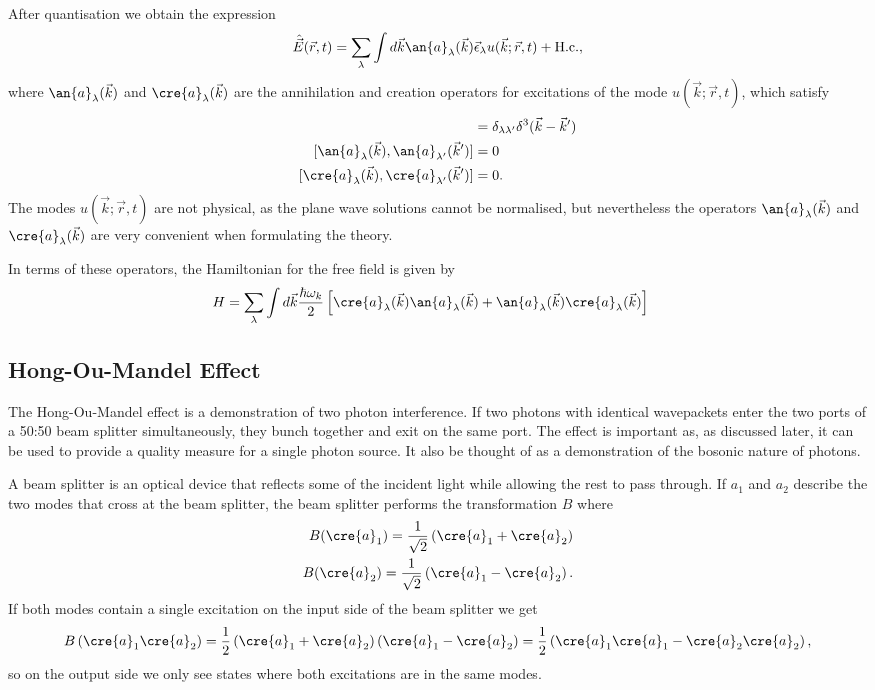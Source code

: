 After quantisation we obtain the expression
\begin{align}
  \hat{\vec{E}}(\vec{r}, t) = \sum_\lambda \int d\vec{k} \an{a}_\lambda(\vec{k})\vec{\epsilon}_\lambda u(\vec{k}; \vec{r}, t) + \text{H.c.},
\end{align}
where $\an{a}_\lambda(\vec{k})$ and $\cre{a}_\lambda(\vec{k})$ are the annihilation and creation operators for excitations of the mode $u(\vec{k}; \vec{r},t)$, which satisfy
\begin{align}
  [\an{a}_\lambda(\vec{k}), \cre{a}_{\lambda '}(\vec{k}')]  &= \delta_{\lambda\lambda '}\delta^3(\vec{k} - \vec{k}') \\
  [\an{a}_\lambda(\vec{k}), \an{a}_{\lambda '}(\vec{k}')]  &= 0 \\
  [\cre{a}_\lambda(\vec{k}), \cre{a}_{\lambda '}(\vec{k}')] &= 0.
\end{align}
The modes $u(\vec{k}; \vec{r}, t)$ are not physical, as the plane wave solutions cannot be normalised, but nevertheless the operators  $\an{a}_\lambda(\vec{k})$ and $\cre{a}_\lambda(\vec{k})$ are very convenient when formulating the theory.

In terms of these operators, the Hamiltonian for the free field is given by
\begin{align}
  H &= \sum_\lambda \int d\vec{k} \frac{\hbar\omega_k}{2} \left[ \cre{a}_\lambda(\vec{k})\an{a}_\lambda(\vec{k}) + \an{a}_\lambda(\vec{k})\cre{a}_\lambda(\vec{k}) \right]
\end{align}


\subsection{Hong-Ou-Mandel Effect}

The Hong-Ou-Mandel effect is a demonstration of two photon interference. If two photons with identical wavepackets enter the two ports of a 50:50 beam splitter simultaneously, they bunch together and exit on the same port. The effect is important as, as discussed later, it can be used to provide a quality measure for a single photon source. It also be thought of as a demonstration of the bosonic nature of photons.

A beam splitter is an optical device that reflects some of the incident light while allowing the rest to pass through. If  $a_1$ and $a_2$ describe the two modes that cross at the beam splitter, the beam splitter performs the transformation $B$ where
\begin{align}
  B (\cre{a}_{1}) = \frac{1}{\sqrt{2}} \left(\cre{a}_{1} + \cre{a}_{2}\right) \\
  B (\cre{a}_{2}) = \frac{1}{\sqrt{2}} \left(\cre{a}_{1} - \cre{a}_{2}\right).
\end{align}
If both modes contain a single excitation on the input side of the beam splitter we get
\begin{align}
  B\left(\cre{a}_{1}\cre{a}_{2}\right) = \frac{1}{2}\left(\cre{a}_{1} + \cre{a}_{2}\right) \left(\cre{a}_{1} - \cre{a}_{2}\right) = \frac{1}{2}\left(\cre{a}_{1}\cre{a}_{1} - \cre{a}_{2}\cre{a}_{2}\right),
\end{align}
so on the output side we only see states where both excitations are in the same modes.

